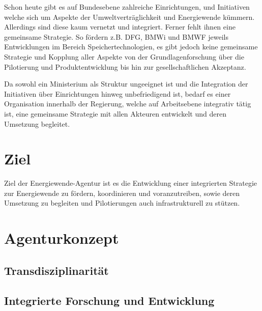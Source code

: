 Schon heute gibt es auf Bundesebene zahlreiche Einrichtungen, und Initiativen welche sich um Aspekte der Umweltverträglichkeit und Energiewende kümmern.
Allerdings sind diese kaum vernetzt und integriert.
Ferner fehlt ihnen eine gemeinsame Strategie.
So fördern z.B. DFG, BMWi und BMWF jeweils Entwicklungen im Bereich Speichertechnologien, es gibt jedoch keine gemeinsame Strategie und Kopplung aller Aspekte von der Grundlagenforschung über die Pilotierung und Produktentwicklung bis hin zur gesellschaftlichen Akzeptanz.

Da sowohl ein Ministerium als Struktur ungeeignet ist und die Integration der Initiativen über Einrichtungen hinweg unbefriedigend ist, bedarf es einer Organisation innerhalb der Regierung, welche auf Arbeitsebene integrativ tätig ist, eine gemeinsame Strategie mit allen Akteuren entwickelt und deren Umsetzung begleitet.

\section{Ziel}

Ziel der Energiewende-Agentur ist es die Entwicklung einer integrierten Strategie zur Energiewende zu fördern, koordinieren und voranzutreiben, sowie deren Umsetzung zu begleiten und Pilotierungen auch infrastrukturell zu stützen.



\section{Agenturkonzept}

\subsection{Transdisziplinarität}


\subsection{Integrierte Forschung und Entwicklung}

